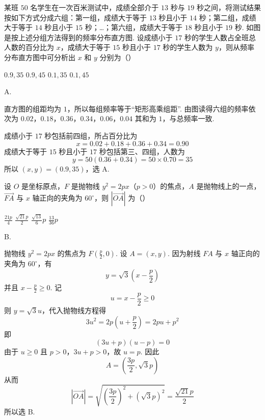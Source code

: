 \begin{problem}
某班 \(50\) 名学生在一次百米测试中，成绩全部介于 \(13\) 秒与 \(19\) 秒之间，将测试结果按如下方式分成六组：第一组，成绩大于等于 \(13\) 秒且小于 \(14\) 秒；第二组，成绩大于等于 \(14\) 秒且小于 \(15\) 秒；…；第六组，成绩大于等于 \(18\) 秒且小于 \(19\) 秒. 如图是按上述分组方法得到的频率分布直方图. 设成绩小于 \(17\) 秒的学生人数占全班总人数的百分比为 \(x\)，成绩大于等于 \(15\) 秒且小于 \(17\) 秒的学生人数为 \(y\)，则从频率分布直方图中可分析出 \(x\) 和 \(y\) 分别为（\quad）


\choices
    {\(0.9, 35\)}
    {\(0.9, 45\)}
    {\(0.1, 35\)}
    {\(0.1, 45\)}
\end{problem}

\begin{answer}
A.
\end{answer}

\begin{solution}
直方图的组距均为 \(1\)，所以每组频率等于“矩形高乘组距”. 由图读得六组的频率依次为
\(0.02\)，\(0.18\)，\(0.36\)，\(0.34\)，\(0.06\)，\(0.04\)
其和为 \(1\)，与总频率一致.

成绩小于 \(17\) 秒包括前四组，所占百分比为
\[
x=0.02+0.18+0.36+0.34=0.90
\]
成绩大于等于 \(15\) 秒且小于 \(17\) 秒包括第三、四组，人数为
\[
y=50(0.36+0.34)=50\times0.70=35
\]
所以 \((x,y)=(0.9,35)\)，选 A.
\end{solution}

\begin{problem}
设 \(O\) 是坐标原点，\(F\) 是抛物线 \( y^{2} = 2px \)（\(p > 0\)）的焦点，\(A\) 是抛物线上的一点，\( \overrightarrow{FA} \) 与 \(x\) 轴正向的夹角为 \( 60^{\circ} \)，则 \( \left|\overrightarrow{OA}\right| \) 为（\quad）

\choices
    {\(\frac{21p}{4}\)}
    {\(\frac{\sqrt{21}p}{2}\)}
    {\(\frac{\sqrt{13}}{6} p\)}
    {\(\frac{13}{36} p\)}
\end{problem}

\begin{answer}
B.
\end{answer}

\begin{solution}
抛物线 \(y^2=2px\) 的焦点为 \(F(\frac p2,0)\). 设 \(A=(x,y)\). 因为射线 \(FA\) 与 \(x\) 轴正向的夹角为 \(60^\circ\)，有
\[
y=\sqrt3\left(x-\frac p2\right)
\]
并且 \(x-\frac p2\geqslant0\). 记
\[
u=x-\frac p2\geqslant0
\]
则 \(y=\sqrt3u\)，代入抛物线方程得
\[
3u^2=2p\left(u+\frac p2\right)=2pu+p^2
\]
即
\[
(3u+p)(u-p)=0
\]
由于 \(u\geqslant0\) 且 \(p>0\)，\(3u+p>0\)，故 \(u=p\). 因此
\[
A=\left(\frac{3p}{2},\sqrt3p\right)
\]
从而
\[
|\overrightarrow{OA}|=\sqrt{\left(\frac{3p}{2}\right)^2+(\sqrt3p)^2}
=\frac{\sqrt{21}p}{2}
\]
所以选 B.
\end{solution}

